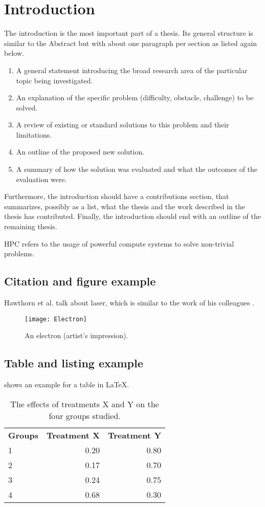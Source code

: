 \section{Introduction}
The introduction is the most important part of a thesis. Its general structure is similar to the Abstract but with about one paragraph per section as listed again below.
\begin{enumerate}
	\item  A general statement introducing the broad research area of the particular topic being investigated.
	\item  An explanation of the specific problem (difficulty, obstacle, challenge) to be solved.
	\item  A review of existing or standard solutions to this problem and their limitations.
	\item  An outline of the proposed new solution.
	\item  A summary of how the solution was evaluated and what the outcomes of the evaluation were.
\end{enumerate}
Furthermore, the introduction should have a contributions section, that summarizes, possibly as a list, what the thesis and the work described in the thesis has contributed.
Finally, the introduction should end with an outline of the remaining thesis.

\ac{HPC} refers to the usage of powerful compute systems to solve non-trivial problems.

\subsection{Citation and figure example}
Hawthorn et al. \cite{Reference1} talk about laser, which is similar to the work of his colleagues \cite{Reference2, Reference3}.
\begin{figure}[th]
\centering
\texttt{[image: Electron]}
\caption[An Electron]{An electron (artist's impression).}
\label{fig:Electron}
\end{figure}

\subsection{Table and listing example}
 shows an example for a table in \LaTeX.

\begin{table}[th]
	\caption{The effects of treatments X and Y on the four groups studied.}
	\label{tab:treatments}
	\centering
	\begin{NiceTabular}{lrr}
		\CodeBefore
		\Body
		\textbf{Groups} & \textbf{Treatment X} & \textbf{Treatment Y} \\
		1 & 0.20 & 0.80\\
		2 & 0.17 & 0.70\\
		3 & 0.24 & 0.75\\
		4 & 0.68 & 0.30\\
	\end{NiceTabular}
\end{table}


